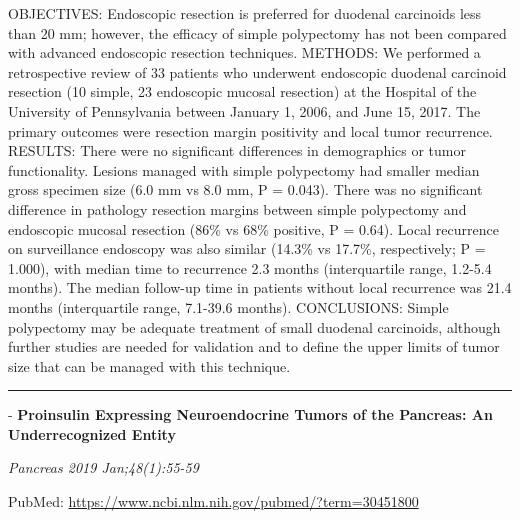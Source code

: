 \documentclass[]{article}
\begin{document}
OBJECTIVES: Endoscopic resection is preferred for duodenal carcinoids
less than 20 mm; however, the efficacy of simple polypectomy has not
been compared with advanced endoscopic resection techniques. METHODS: We
performed a retrospective review of 33 patients who underwent endoscopic
duodenal carcinoid resection (10 simple, 23 endoscopic mucosal
resection) at the Hospital of the University of Pennsylvania between
January 1, 2006, and June 15, 2017. The primary outcomes were resection
margin positivity and local tumor recurrence. RESULTS: There were no
significant differences in demographics or tumor functionality. Lesions
managed with simple polypectomy had smaller median gross specimen size
(6.0 mm vs 8.0 mm, P = 0.043). There was no significant difference in
pathology resection margins between simple polypectomy and endoscopic
mucosal resection (86\% vs 68\% positive, P = 0.64). Local recurrence on
surveillance endoscopy was also similar (14.3\% vs 17.7\%, respectively;
P = 1.000), with median time to recurrence 2.3 months (interquartile
range, 1.2-5.4 months). The median follow-up time in patients without
local recurrence was 21.4 months (interquartile range, 7.1-39.6 months).
CONCLUSIONS: Simple polypectomy may be adequate treatment of small
duodenal carcinoids, although further studies are needed for validation
and to define the upper limits of tumor size that can be managed with
this technique.

{}

{}

\begin{center}\rule{0.5\linewidth}{\linethickness}\end{center}

 - \textbf{Proinsulin Expressing Neuroendocrine Tumors of the Pancreas:
An Underrecognized Entity}

\emph{Pancreas 2019 Jan;48(1):55-59}

PubMed: \url{https://www.ncbi.nlm.nih.gov/pubmed/?term=30451800}
\end{document}
